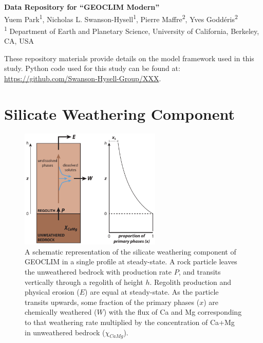 \documentclass[11pt,letterpaper]{article}
\begin{document}
\begin{flushleft}
{\Large \textbf{Data Repository for ``GEOCLIM Modern''}}
\\
Yuem Park\textsuperscript{1},
Nicholas L. Swanson-Hysell\textsuperscript{1},
Pierre Maffre\textsuperscript{2},
Yves Godd\'eris\textsuperscript{2}
\\
\bigskip
\textsuperscript{1} Department of Earth and Planetary Science, University of California, Berkeley, CA, USA
\\
\bigskip

\end{flushleft}

\linenumbers

These repository materials provide details on the model framework used in this study. Python code used for this study can be found at: \url{https://github.com/Swanson-Hysell-Group/XXX}.

\section*{Silicate Weathering Component}

\begin{figure}
\begin{center}
	\includegraphics[width=0.6\textwidth]{../Figures/regolith_schematic.pdf}
	\caption{A schematic representation of the silicate weathering component of GEOCLIM in a single profile at steady-state. A rock particle leaves the unweathered bedrock with production rate $P$, and transits vertically through a regolith of height $h$. Regolith production and physical erosion ($E$) are equal at steady-state. As the particle transits upwards, some fraction of the primary phases ($x$) are chemically weathered ($W$) with the flux of Ca and Mg corresponding to that weathering rate multiplied by the concentration of Ca+Mg in unweathered bedrock ($\chi_{CaMg}$).}
	\label{fig:regolith_schematic}
\end{center}
\end{figure}
\end{document}
